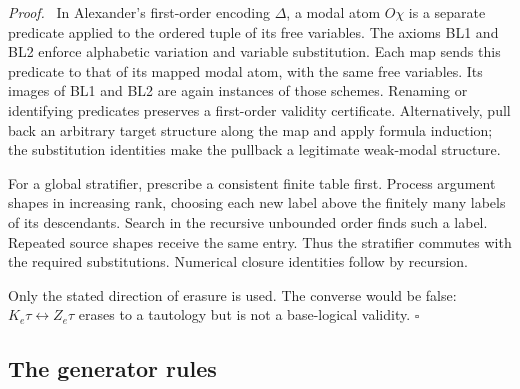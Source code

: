 \documentclass[11pt]{article}
\newcommand{\qed}{\hfill\ensuremath{\square}}
\newenvironment{proof}{\par\emph{Proof.}\ }{\qed\par}
\begin{document}
\begin{proof}
In Alexander's first-order encoding $\Delta$, a modal atom $O\chi$ is
a separate predicate applied to the ordered tuple of its free
variables. The axioms BL1 and BL2 enforce alphabetic variation and
variable substitution. Each map sends this predicate to that of its
mapped modal atom, with the same free variables. Its images of BL1
and BL2 are again instances of those schemes. Renaming or identifying
predicates preserves a first-order validity certificate. Alternatively,
pull back an arbitrary target structure along the map and apply formula
induction; the substitution identities make the pullback a legitimate
weak-modal structure.

For a global stratifier, prescribe a consistent finite table first.
Process argument shapes in increasing rank, choosing each new label
above the finitely many labels of its descendants. Search in the
recursive unbounded order finds such a label. Repeated source shapes
receive the same entry. Thus the stratifier commutes with the required
substitutions. Numerical closure identities follow by recursion.

Only the stated direction of erasure is used. The converse would be
false: $K_e\tau\leftrightarrow Z_e\tau$ erases to a tautology but is
not a base-logical validity.
\end{proof}

\subsection*{The generator rules}
\end{document}
